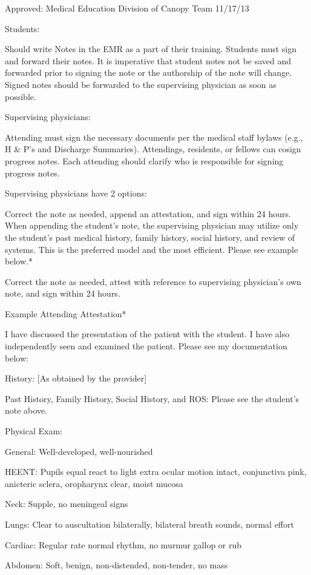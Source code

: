 \documentclass[
]{book}
\begin{document}
Approved: Medical Education Division of Canopy Team 11/17/13

Students:

Should write Notes in the EMR as a part of their training. Students must sign and forward their notes. It is imperative that student notes not be saved and forwarded prior to signing the note or the authorship of the note will change. Signed notes should be forwarded to the supervising physician as soon as possible.

Supervising physicians:

Attending must sign the necessary documents per the medical staff bylaws (e.g., H \& P's and Discharge Summaries). Attendings, residents, or fellows can cosign progress notes. Each attending should clarify who is responsible for signing progress notes.

Supervising physicians have 2 options:

Correct the note as needed, append an attestation, and sign within 24 hours. When appending the student's note, the supervising physician may utilize only the student's past medical history, family history, social history, and review of systems. This is the preferred model and the most efficient. Please see example below.*

Correct the note as needed, attest with reference to supervising physician's own note, and sign within 24 hours.

Example Attending Attestation*

I have discussed the presentation of the patient with the student. I have also independently seen and examined the patient. Please see my documentation below:

History: {[}As obtained by the provider{]}

Past History, Family History, Social History, and ROS: Please see the student's note above.

Physical Exam:

General: Well-developed, well-nourished

HEENT: Pupils equal react to light extra ocular motion intact, conjunctiva pink, anicteric sclera, oropharynx clear, moist mucosa

Neck: Supple, no meningeal signs

Lungs: Clear to auscultation bilaterally, bilateral breath sounds, normal effort

Cardiac: Regular rate normal rhythm, no murmur gallop or rub

Abdomen: Soft, benign, non-distended, non-tender, no mass
\end{document}

